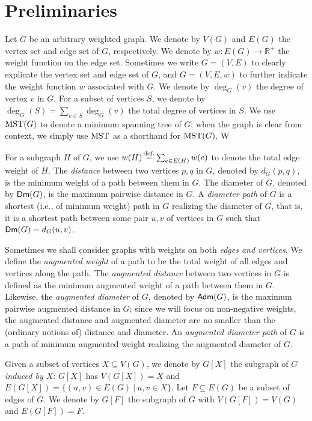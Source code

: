 
\section{Preliminaries}\label{sec:prelim}

Let $G$ be an arbitrary weighted graph. We denote by $V(G)$ and $E(G)$ the vertex set and edge set of $G$, respectively. We denote by $w: E(G)\rightarrow \mathbb{R}^+$ the weight function on the edge set.  Sometimes we write $G = (V,E)$ to clearly explicate the vertex set and edge set of $G$, and  $G =(V,E,w)$ to further indicate the weight function $w$ associated with $G$. We denote by $\deg_{G}(v)$ the degree of vertex $v$ in $G$. For a subset of vertices $S$, we denote by $\deg_G(S) = \sum_{v\in S}\deg_G(v)$ the total degree of vertices in $S$.  We use $\mathrm{MST}(G)$ to denote a minimum spanning tree of $G$; when the graph is clear from context, we simply use $\mathrm{MST}$  as a shorthand for $\mathrm{MST}(G)$. W


For a subgraph $H$ of $G$, we use $w(H) \operatorname{\overset{\mathrm{def.}}{=}} \sum_{e\in E(H)}w(e)$ to denote the total edge weight of $H$.   The {\em distance} between two vertices $p,q$ in $G$, denoted by $d_G(p,q)$, is the minimum weight of a path between them in $G$. The diameter of $G$,
denoted by $\mathsf{Dm}(G)$, is the maximum pairwise distance in $G$. A \emph{diameter path} of $G$ is a shortest (i.e., of minimum weight) path in $G$ realizing the diameter of $G$, that is, 
it is a shortest path between some pair $u,v$ of vertices in $G$ such that $\mathsf{Dm}(G) = d_G(u,v)$.


Sometimes we shall consider graphs with weights on both \emph{edges and vertices}. We define the \emph{augmented weight} of a path to be the total weight of all edges and vertices along the path. The \emph{augmented distance} between two vertices in $G$ is defined as the minimum augmented weight of a path between them in $G$. 
Likewise, the \emph{augmented diameter} of $G$, denoted by $\mathsf{Adm}(G)$,
 is the maximum pairwise augmented distance in $G$; 
since we will focus on non-negative weights, the augmented distance and augmented diameter
are no smaller than the (ordinary notions of) distance and diameter. 
An \emph{augmented diameter path} of $G$ is a path of minimum augmented weight realizing the augmented diameter of $G$. 


Given a subset of vertices $X\subseteq V(G)$, we denote by $G[X]$ the subgraph of $G$ \emph{induced by $X$}: $G[X]$ has $V(G[X]) = X$ and $E(G[X]) = \{(u,v)\in E(G) ~\vert~   u,v \in X\}$. Let $F\subseteq E(G)$ be a subset of edges of $G$. We denote by $G[F]$ the subgraph of $G$ with $V(G[F]) = V(G)$ and $E(G[F]) = F$.



